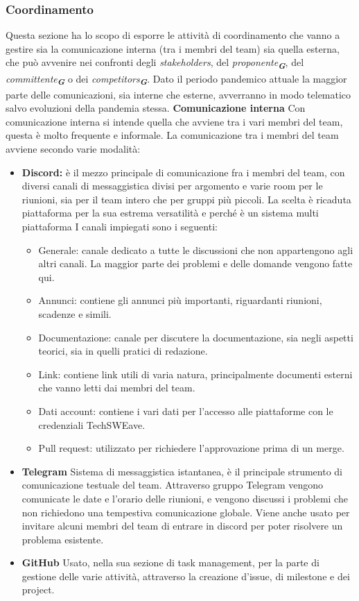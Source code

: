 \subsubsection{Coordinamento}
Questa sezione ha lo scopo di esporre le attività di coordinamento che vanno a gestire sia la comunicazione interna (tra i membri del team) sia quella esterna, che può avvenire nei confronti degli \textit{stakeholders}, del \textit{proponente\textsubscript{\textbf{G}}}, del \textit{committente\textsubscript{\textbf{G}}} o dei \textit{competitors\textsubscript{\textbf{G}}}. Dato il periodo pandemico attuale la maggior parte delle comunicazioni, sia interne che esterne, avverranno in modo telematico salvo evoluzioni della pandemia stessa.
\textbf{Comunicazione interna}
Con comunicazione interna si intende quella che avviene tra i vari membri del team, questa è molto frequente e informale. La comunicazione tra i membri del team avviene secondo varie modalità:
\begin{itemize}
    \item \textbf{Discord:}
          è il mezzo principale di comunicazione fra i membri del team, con diversi canali di messaggistica divisi per argomento e varie room per le riunioni, sia per il team intero che per gruppi più piccoli. La scelta è ricaduta piattaforma per la sua estrema versatilità e perché è un sistema multi piattaforma
          I canali impiegati sono i seguenti:
          \begin{itemize}
              \item Generale: canale dedicato a tutte le discussioni che non appartengono agli altri canali. La maggior parte dei problemi e delle domande vengono fatte qui.
              \item Annunci: contiene gli annunci più importanti, riguardanti riunioni, scadenze e simili.
              \item Documentazione: canale per discutere la documentazione, sia negli aspetti teorici, sia in quelli pratici di redazione.
              \item Link: contiene link utili di varia natura, principalmente documenti esterni che vanno letti dai membri del team.
              \item Dati account: contiene i vari dati per l'accesso alle piattaforme con le credenziali TechSWEave.
              \item Pull request: utilizzato per richiedere l'approvazione prima di un merge.
          \end{itemize}
    \item \textbf{Telegram}
          Sistema di messaggistica istantanea, è il principale strumento di comunicazione testuale del team. Attraverso gruppo Telegram vengono comunicate le date e l'orario delle riunioni, e vengono discussi i problemi che non richiedono una tempestiva comunicazione globale. Viene anche usato per invitare alcuni membri del team di entrare in discord per poter risolvere un problema esistente.
    \item \textbf{GitHub}
          Usato, nella sua sezione di task management, per la parte di gestione delle varie attività, attraverso la creazione d'issue, di milestone e dei project.
\end{itemize}
